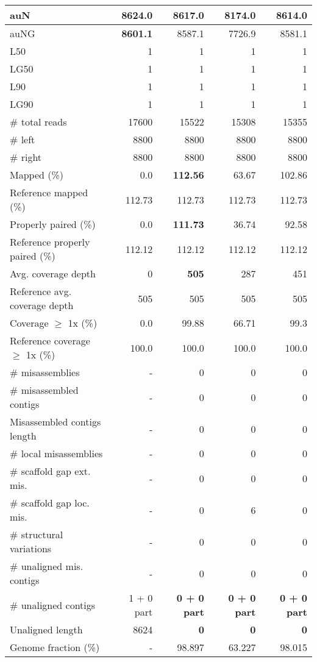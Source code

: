 \documentclass[12pt,a4paper]{article}
\begin{document}
\begin{table}[ht]
\begin{center}
\begin{tabular}{|l*{4}{|r}|}
auN & {\bf 8624.0} & 8617.0 & 8174.0 & 8614.0 \\ \hline
auNG & {\bf 8601.1} & 8587.1 & 7726.9 & 8581.1 \\ \hline
L50 & 1 & 1 & 1 & 1 \\ \hline
LG50 & 1 & 1 & 1 & 1 \\ \hline
L90 & 1 & 1 & 1 & 1 \\ \hline
LG90 & 1 & 1 & 1 & 1 \\ \hline
\# total reads & 17600 & 15522 & 15308 & 15355 \\ \hline
\# left & 8800 & 8800 & 8800 & 8800 \\ \hline
\# right & 8800 & 8800 & 8800 & 8800 \\ \hline
Mapped (\%) & 0.0 & {\bf 112.56} & 63.67 & 102.86 \\ \hline
Reference mapped (\%) & 112.73 & 112.73 & 112.73 & 112.73 \\ \hline
Properly paired (\%) & 0.0 & {\bf 111.73} & 36.74 & 92.58 \\ \hline
Reference properly paired (\%) & 112.12 & 112.12 & 112.12 & 112.12 \\ \hline
Avg. coverage depth & 0 & {\bf 505} & 287 & 451 \\ \hline
Reference avg. coverage depth & 505 & 505 & 505 & 505 \\ \hline
Coverage $\geq$ 1x (\%) & 0.0 & 99.88 & 66.71 & 99.3 \\ \hline
Reference coverage $\geq$ 1x (\%) & 100.0 & 100.0 & 100.0 & 100.0 \\ \hline
\# misassemblies & - & 0 & 0 & 0 \\ \hline
\# misassembled contigs & - & 0 & 0 & 0 \\ \hline
Misassembled contigs length & - & 0 & 0 & 0 \\ \hline
\# local misassemblies & - & 0 & 0 & 0 \\ \hline
\# scaffold gap ext. mis. & - & 0 & 0 & 0 \\ \hline
\# scaffold gap loc. mis. & - & 0 & 6 & 0 \\ \hline
\# structural variations & - & 0 & 0 & 0 \\ \hline
\# unaligned mis. contigs & - & 0 & 0 & 0 \\ \hline
\# unaligned contigs & 1 + 0 part & {\bf 0 + 0 part} & {\bf 0 + 0 part} & {\bf 0 + 0 part} \\ \hline
Unaligned length & 8624 & {\bf 0} & {\bf 0} & {\bf 0} \\ \hline
Genome fraction (\%) & - & 98.897 & 63.227 & 98.015 \\ \hline

\end{tabular}
\end{center}
\end{table}
\end{document}
